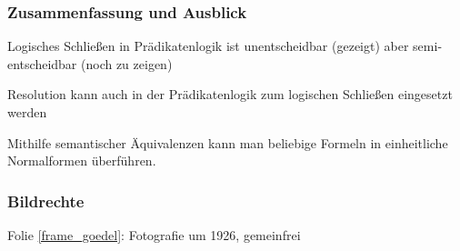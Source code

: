 \documentclass[onlymath]{beamer}
\begin{document}
% 
% 






\begin{frame}\frametitle{Zusammenfassung und Ausblick}

Logisches Schließen in Prädikatenlogik ist unentscheidbar
(gezeigt)
aber semi-entscheidbar 
(noch zu zeigen)\bigskip

Resolution kann auch in der Prädikatenlogik zum logischen Schließen eingesetzt werden
\bigskip

Mithilfe semantischer Äquivalenzen kann man beliebige Formeln in einheitliche Normalformen überführen.\bigskip


\end{frame}




\begin{frame}[t]\frametitle{Bildrechte}

Folie \ref{frame_goedel}: Fotografie um 1926, gemeinfrei

\end{frame}
\end{document}
